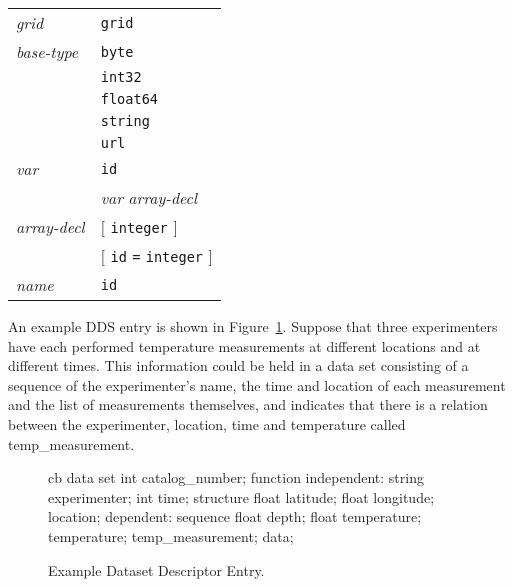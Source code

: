 \begin{table}
\begin{center}
\begin{tabular}{ll}
{\em grid\/}    & {\tt grid} \\

{\em base-type\/} & {\tt byte} \\ 
                  & {\tt int32} \\
                  & {\tt float64} \\
                  & {\tt string} \\
                  & {\tt url} \\

{\em var\/}     & {\tt id} \\
                & {\em var} {\em array-decl\/} \\

{\em array-decl\/} & {\tt $[$} {\tt integer} {\tt $]$} \\
                   & {\tt $[$} {\tt id} {\tt =} {\tt integer} {\tt $]$} \\

{\em name\/}    & {\tt id} \\
\end{tabular}
\end{center}
\normalsize
\end{table}

An example DDS entry is shown in Figure~\ref{fig:dds}. Suppose that three
experimenters have each performed temperature measurements at different
locations and at different times. This information could be held in a data set
consisting of a sequence of the experimenter's name, the time and location of
each measurement and the list of measurements themselves, and indicates that
there is a relation between the experimenter, location, time and temperature
called temp\_measurement.

\begin{figure}
\begin{code}{cb}
              data set {
                  int catalog_number;
                  function {
                    independent:
                      string experimenter;
                      int time;
                      structure {
                          float latitude;
                          float longitude;
                      } location;
                    dependent:
                      sequence {
                          float depth;
                          float temperature;
                      } temperature;
                  } temp_measurement;
              } data;
\end{code}
\caption{Example Dataset Descriptor Entry.}
\label{fig:dds}
\end{figure}

